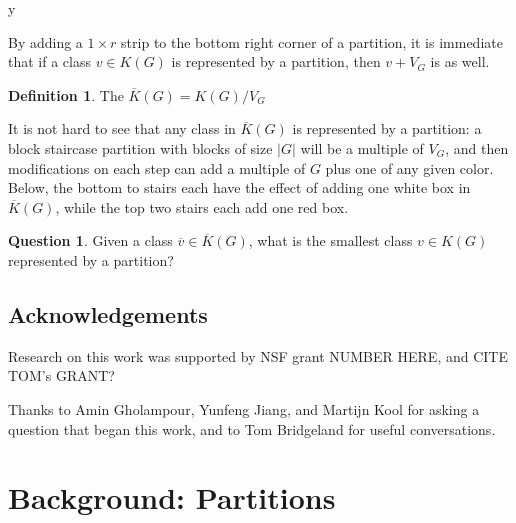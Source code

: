 y\documentclass{amsart}[12pt]
\theoremstyle{definition}
\newtheorem{definition}[dummy]{Definition}
\newtheorem{question}{Question}
\begin{document}
By adding a $1\times r$ strip to the bottom right corner of a partition, it is immediate that if a class $v\in K(G)$ is represented by a partition, then $v+V_G$ is as well. 

\begin{definition}
The $\overline{K}(G)=K(G)/V_G$ 
\end{definition}

It is not hard to see that any class in $\overline{K}(G)$ is represented by a partition: a block staircase partition with blocks of size $|G|$ will be a multiple of $V_G$, and then modifications on each step can add a multiple of $G$ plus one of any given color.  Below, the bottom to stairs each have the effect of adding one white box in $\overline{K}(G)$, while the top two stairs each add one red box.



\begin{question}
Given a class $\overline{v}\in \overline{K}(G)$, what is the smallest class $v\in K(G)$ represented by a partition?
\end{question}


\subsection{Acknowledgements}

Research on this work was supported by NSF grant NUMBER HERE, and CITE TOM's GRANT?

Thanks to Amin Gholampour, Yunfeng Jiang, and Martijn Kool for asking a question that began this work, and to Tom Bridgeland for useful conversations.

\section{Background: Partitions}
\end{document}
